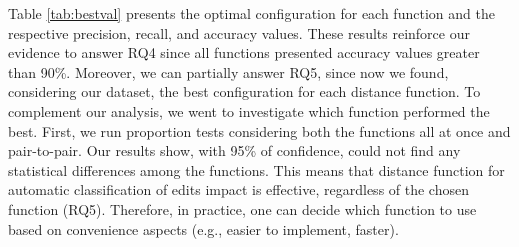 Table \ref{tab:bestval} presents the optimal configuration for each function and the respective precision, recall, and accuracy values. These results reinforce our evidence to answer RQ4 since all functions presented accuracy values greater than 90\%. Moreover, we can partially answer RQ5, since now we found, considering our dataset, the best configuration for each distance function. To complement our analysis, we went to investigate which function performed the best. First, we run proportion tests considering both the functions all at once and pair-to-pair. Our results show, with 95\% of confidence, could not find any statistical differences among the functions. This means that distance function for automatic classification of edits impact is effective, regardless of the chosen function (RQ5). Therefore, in practice, one can decide which function to use based on convenience aspects (e.g., easier to implement, faster). 

\\
\\
\noindent
\vspace{2mm} %

